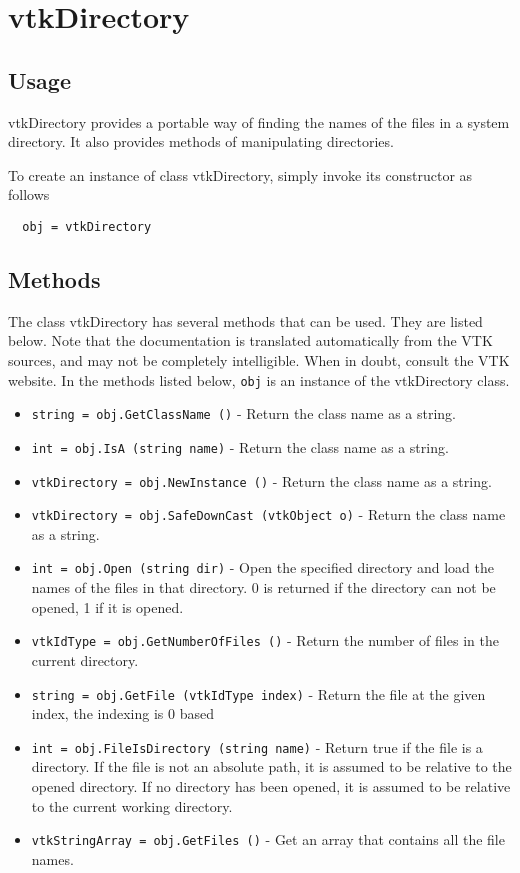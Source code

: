 \section{vtkDirectory}

\subsection{Usage}

 vtkDirectory provides a portable way of finding the names of the files
 in a system directory.  It also provides methods of manipulating directories.

To create an instance of class vtkDirectory, simply
invoke its constructor as follows
\begin{verbatim}
  obj = vtkDirectory
\end{verbatim}
\subsection{Methods}

The class vtkDirectory has several methods that can be used.
  They are listed below.
Note that the documentation is translated automatically from the VTK sources,
and may not be completely intelligible.  When in doubt, consult the VTK website.
In the methods listed below, \verb|obj| is an instance of the vtkDirectory class.
\begin{itemize}
\item  \verb|string = obj.GetClassName ()| -  Return the class name as a string.

\item  \verb|int = obj.IsA (string name)| -  Return the class name as a string.

\item  \verb|vtkDirectory = obj.NewInstance ()| -  Return the class name as a string.

\item  \verb|vtkDirectory = obj.SafeDownCast (vtkObject o)| -  Return the class name as a string.

\item  \verb|int = obj.Open (string dir)| -  Open the specified directory and load the names of the files
 in that directory. 0 is returned if the directory can not be 
 opened, 1 if it is opened.   

\item  \verb|vtkIdType = obj.GetNumberOfFiles ()| -  Return the number of files in the current directory.

\item  \verb|string = obj.GetFile (vtkIdType index)| -  Return the file at the given index, the indexing is 0 based

\item  \verb|int = obj.FileIsDirectory (string name)| -  Return true if the file is a directory.  If the file is not an
 absolute path, it is assumed to be relative to the opened
 directory. If no directory has been opened, it is assumed to
 be relative to the current working directory.

\item  \verb|vtkStringArray = obj.GetFiles ()| -  Get an array that contains all the file names.

\end{itemize}
